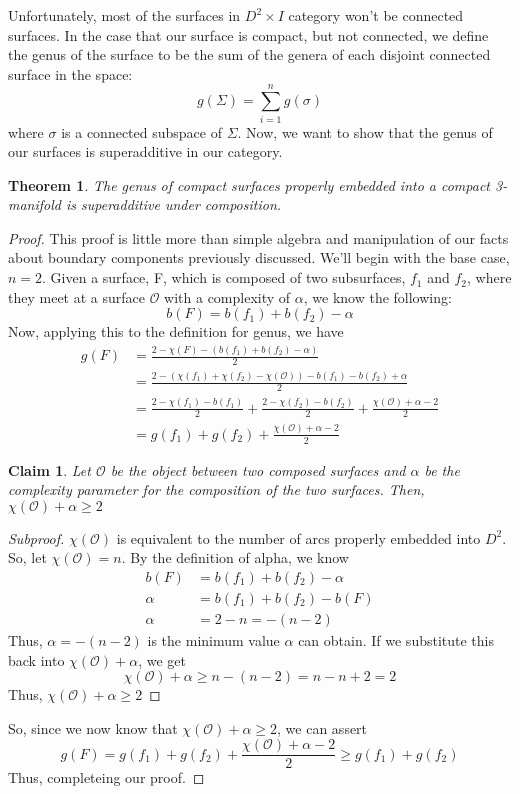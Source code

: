 \documentclass[11pt]{article}
\newcommand{\parent}{D^2\times I}
\newtheorem*{theorem}{Theorem}
\newtheorem*{claim}{Claim}
\newenvironment{subproof}[1][Subproof]{
  \renewcommand{\qedsymbol}{$\blacksquare$} %
  \begin{proof}[#1]
}{
  \end{proof}
}
\begin{document}
Unfortunately, most of the surfaces in $\parent$ category won't be connected surfaces. In the case that our surface is compact, but not connected, we define the genus of the surface to be the sum of the genera of each disjoint connected surface in the space:
\[ g(\Sigma) = \sum_{i=1}^n g(\sigma)\]
where $\sigma$ is a connected subspace of $\Sigma$. Now, we want to show that the genus of our surfaces is superadditive in our category.
\begin{theorem}The genus of compact surfaces properly embedded into a compact 3-manifold is superadditive under composition. \end{theorem}
\begin{proof}
This proof is little more than simple algebra and manipulation of our facts about boundary components previously discussed. We'll begin with the base case, $n=2$. Given a surface, F, which is composed of two subsurfaces, $f_1$ and $f_2$, where they meet at a surface $\mathscr{O}$ with a complexity of $\alpha$, we know the following:
\[
b(F) = b(f_1) + b(f_2)-\alpha
\]
Now, applying this to the definition for genus, we have
\begin{align*}
g(F) &= \frac{2-\chi(F)-(b(f_1)+b(f_2)-\alpha)}{2}\\
&= \frac{2-(\chi(f_1)+\chi(f_2)-\chi(\mathscr{O}))-b(f_1)-b(f_2)+\alpha}{2}\\
&= \frac{2-\chi(f_1)-b(f_1)}{2} + \frac{2-\chi(f_2)-b(f_2)}{2} + \frac{\chi(\mathscr{O})+\alpha-2}{2}\\
&= g(f_1) + g(f_2) + \frac{\chi(\mathscr{O}) + \alpha -2}{2}
\end{align*}
\begin{claim}
Let $\mathscr{O}$ be the object between two composed surfaces and $\alpha$ be the complexity parameter for the composition of the two surfaces. Then, $\chi(\mathscr{O})+\alpha \geq 2 $
\end{claim}
\begin{subproof}
$\chi(\mathscr{O})$ is equivalent to the number of arcs properly embedded into $D^2$. So, let $\chi(\mathscr{O}) = n$. By the definition of alpha, we know
\begin{align*}
b(F) &= b(f_1)+b(f_2)-\alpha\\
\alpha &= b(f_1)+b(f_2)-b(F)\\
\alpha &= 2-n = -(n-2)
\end{align*}
Thus, $\alpha = -(n-2)$ is the minimum value $\alpha$ can obtain. If we substitute this back into $\chi(\mathscr{O})+\alpha$, we get
\[\chi(\mathscr{O})+\alpha \geq n-(n-2) = n-n+2 = 2\]
Thus, $\chi(\mathscr{O}) + \alpha \geq 2$
\end{subproof}
So, since we now know that $\chi(\mathscr{O})+\alpha \geq 2$, we can assert
\[g(F) = g(f_1) + g(f_2)+\frac{\chi(\mathscr{O}) + \alpha -2}{2} \geq g(f_1)+g(f_2)\]
Thus, completeing our proof.
\end{proof}
\end{document}
